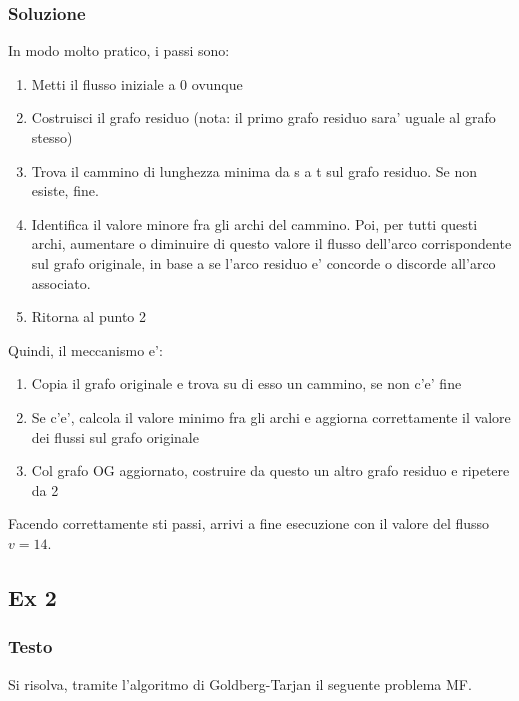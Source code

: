 \subsubsection{Soluzione}
In modo molto pratico, i passi sono:
\begin{enumerate}
\item Metti il flusso iniziale a 0 ovunque
\item Costruisci il grafo residuo (nota: il primo grafo residuo sara' uguale al grafo stesso)
\item Trova il cammino di lunghezza minima da s a t sul grafo residuo. Se non esiste, fine.
\item Identifica il valore minore fra gli archi del cammino. Poi, per tutti questi archi, aumentare o diminuire di questo valore il flusso dell'arco corrispondente sul grafo originale, in base a se l'arco residuo e' concorde o discorde all'arco associato.
\item Ritorna al punto 2
\end{enumerate}
Quindi, il meccanismo e':
\begin{enumerate}
\item Copia il grafo originale e trova su di esso un cammino, se non c'e' fine
\item Se c'e', calcola il valore minimo fra gli archi e aggiorna correttamente il valore dei flussi sul grafo originale
\item Col grafo OG aggiornato, costruire da questo un altro grafo residuo e ripetere da 2
\end{enumerate}


Facendo correttamente sti passi, arrivi a fine esecuzione con il valore del flusso $ v = 14 $.

\subsection{Ex 2}

\subsubsection{Testo}
Si risolva, tramite l’algoritmo di Goldberg-Tarjan il seguente problema MF.

